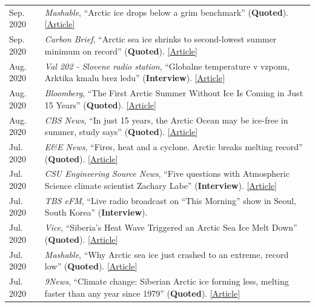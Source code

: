 \documentclass[margin,line,palatino,courier,10pt]{res}
\begin{document}
\begin{resume}
\begin{tabular}{@{}p{0.9in}p{4in}}
Sep. 2020 & \textit{Mashable}, ``Arctic ice drops below a grim benchmark'' (\textbf{Quoted}). \href{https://mashable.com/article/arctic-sea-ice-decline-2020/}{[Article]}\\
Sep. 2020 & \textit{Carbon Brief}, ``Arctic sea ice shrinks to second-lowest summer minimum on record'' (\textbf{Quoted}). \href{https://www.carbonbrief.org/arctic-sea-ice-shrinks-to-second-lowest-summer-minimum-on-record}{[Article]}\\
Aug. 2020 & \textit{Val 202 - Slovene radio station}, ``Globalne temperature v vzponu, Arktika kmalu brez ledu'' (\textbf{Interview}). \href{https://val202.rtvslo.si/2020/08/aktualno-20/}{[Article]}\\
Aug. 2020 & \textit{Bloomberg}, ``The First Arctic Summer Without Ice Is Coming in Just 15 Years'' (\textbf{Quoted}). \href{https://www.bloomberg.com/news/articles/2020-08-17/the-first-arctic-summer-without-ice-is-coming-in-just-15-years?srnd=premium}{[Article]}\\
Aug. 2020 & \textit{CBS News}, ``In just 15 years, the Arctic Ocean may be ice-free in summer, study says'' (\textbf{Quoted}). \href{https://www.cbsnews.com/news/arctic-ocean-climate-change-ice-free-15-years/}{[Article]}\\
Jul. 2020 & \textit{E\&E News}, ``Fires, heat and a cyclone. Arctic breaks melting record'' (\textbf{Quoted}). \href{https://www.eenews.net/stories/1063658765}{[Article]}\\
Jul. 2020 & \textit{CSU Engineering Source News}, ``Five questions with Atmospheric Science climate scientist Zachary Labe'' (\textbf{Interview}). \href{https://engr.source.colostate.edu/five-questions-with-climate-scientist-zachary-labe/}{[Article]}\\
Jul. 2020 & \textit{TBS eFM}, ``Live radio broadcast on “This Morning” show in Seoul, South Korea'' (\textbf{Interview}).\\
Jul. 2020 & \textit{Vice}, ``Siberia's Heat Wave Triggered an Arctic Sea Ice Melt Down'' (\textbf{Quoted}). \href{https://www.vice.com/en_us/article/ep45be/siberias-heat-wave-triggered-an-arctic-sea-ice-melt-down}{[Article]}\\
Jul. 2020 & \textit{Mashable}, ``Why Arctic sea ice just crashed to an extreme, record low'' (\textbf{Quoted}). \href{https://mashable.com/article/arctic-sea-ice-plummets-2020/}{[Article]}\\
Jul. 2020 & \textit{9News}, ``Climate change: Siberian Arctic ice forming less, melting faster than any year since 1979'' (\textbf{Quoted}). \href{https://www.9news.com.au/world/climate-change-global-warming-siberian-heatwave-arctic-ice-melting-faster-us-research-data/}{[Article]}\\

\end{tabular}
\end{resume}
\end{document}
